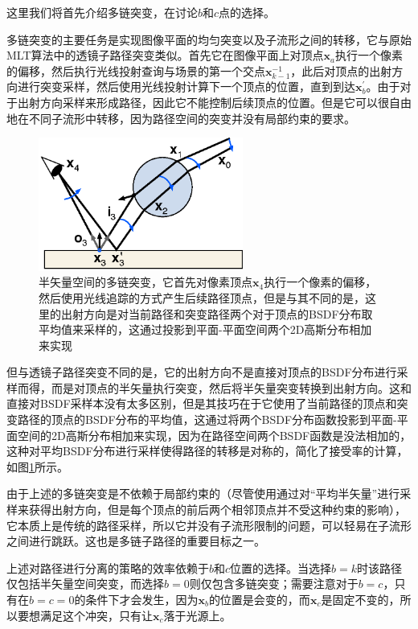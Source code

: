 这里我们将首先介绍多链突变，在讨论$b$和$c$点的选择。

多链突变的主要任务是实现图像平面的均匀突变以及子流形之间的转移，它与原始MLT算法中的透镜子路径突变类似。首先它在图像平面上对顶点$\mathbf{x}_a$执行一个像素的偏移，然后执行光线投射查询与场景的第一个交点$\mathbf{x}^{-1}_{k-1}$，此后对顶点的出射方向进行突变采样，然后使用光线投射计算下一个顶点的位置，直到到达$\mathbf{x}^{'}_b$。由于对于出射方向采样来形成路径，因此它不能控制后续顶点的位置。但是它可以很自由地在不同子流形中转移，因为路径空间的突变并没有局部约束的要求。

\begin{figure}
	\sidecaption
	\includegraphics[width=0.6\textwidth]{figures/mlt/multi-chain-perturbation}
	\caption{半矢量空间的多链突变，它首先对像素顶点$\mathbf{x}_4$执行一个像素的偏移，然后使用光线追踪的方式产生后续路径顶点，但是与其不同的是，这里的出射方向是对当前路径和突变路径两个对于顶点的BSDF分布取平均值来采样的，这通过投影到平面-平面空间两个2D高斯分布相加来实现}
	\label{f:mlt-multi-chain-perturbation}
\end{figure}

但与透镜子路径突变不同的是，它的出射方向不是直接对顶点的BSDF分布进行采样而得，而是对顶点的半矢量执行突变，然后将半矢量突变转换到出射方向。这和直接对BSDF采样本没有太多区别，但是其技巧在于它使用了当前路径的顶点和突变路径的顶点的BSDF分布的平均值，这通过将两个BSDF分布函数投影到平面-平面空间的2D高斯分布相加来实现，因为在路径空间两个BSDF函数是没法相加的，这种对平均BSDF分布进行采样使得路径的转移是对称的，简化了接受率的计算，如图\ref{f:mlt-multi-chain-perturbation}所示。

由于上述的多链突变是不依赖于局部约束的（尽管使用通过对“平均半矢量”进行采样来获得出射方向，但是每个顶点的前后两个相邻顶点并不受这种约束的影响），它本质上是传统的路径采样，所以它并没有子流形限制的问题，可以轻易在子流形之间进行跳跃。这也是多链子路径的重要目标之一。

上述对路径进行分离的策略的效率依赖于$b$和$c$位置的选择。当选择$b=k$时该路径仅包括半矢量空间突变，而选择$b=0$则仅包含多链突变；需要注意对于$b=c$，只有在$b=c=0$的条件下才会发生，因为$\mathbf{x}_b$的位置是会变的，而$\mathbf{x}_c$是固定不变的，所以要想满足这个冲突，只有让$\mathbf{x}_c$落于光源上。

